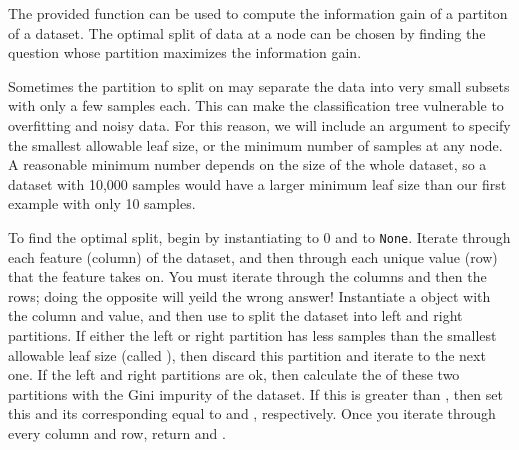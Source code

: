 The provided function  can be used to compute the information gain of a partiton of a dataset.
The optimal split of data at a node can be chosen by finding the question whose partition maximizes the information gain.

Sometimes the partition to split on may separate the data into very small subsets with only a few samples each.
This can make the classification tree vulnerable to overfitting and noisy data.
For this reason, we will include an argument to specify the smallest allowable leaf size, or the minimum number of samples at any node.
A reasonable minimum number depends on the size of the whole dataset, so a dataset with 10,000 samples would have a larger minimum leaf size than our first example with only 10 samples.

To find the optimal split, begin by instantiating  to 0 and  to \texttt{None}.
Iterate through each feature (column) of the dataset, and then through each unique value (row) that the feature takes on.
You must iterate through the columns and then the rows; doing the opposite will yeild the wrong answer!
Instantiate a  object with the column and value, and then use  to split the dataset into left and right partitions.
If either the left or right partition has less samples than the smallest allowable leaf size (called ), then discard this partition and iterate to the next one.
If the left and right partitions are ok, then calculate the  of these two partitions with the Gini impurity of the dataset.
If this  is greater than , then set this  and its corresponding  equal to  and , respectively.
Once you iterate through every column and row, return  and .

